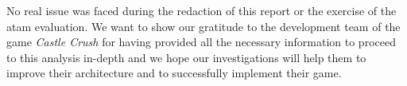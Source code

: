 
No real issue was faced during the redaction of this report or the exercise of the \gls{atam} evaluation. We want to show our gratitude to the development team of the game \textit{Castle Crush} for having provided all the necessary information to proceed to this analysis in-depth and we hope our investigations will help them to improve their architecture and to successfully implement their game.
